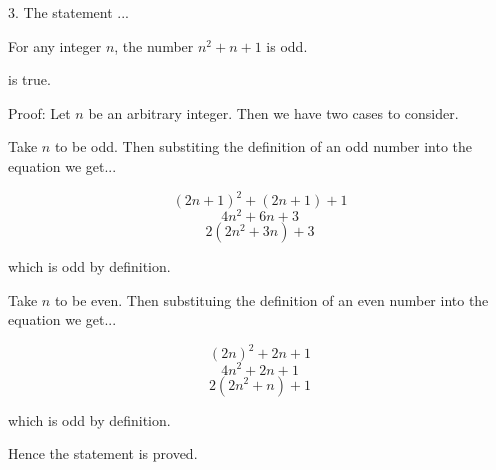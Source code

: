 \documentclass[12pt]{article}
\begin{document}
3. The statement ...\newline

For any integer $n$, the number $n^2 + n + 1$ is odd.\newline

is true.\newline

Proof: Let $n$ be an arbitrary integer. Then we have two cases to consider.\newline

Take $n$ to be odd.  Then substiting the definition of an odd number into the equation we get...

$$(2n+1)^2 + (2n+1) + 1$$
$$4n^2 + 6n + 3$$
$$2(2n^2 + 3n) + 3$$

which is odd by definition.\newline

Take $n$ to be even.  Then substituing the definition of an even number into the equation we get...

$$(2n)^2 + 2n + 1$$
$$4n^2 + 2n + 1$$
$$2(2n^2 + n) + 1$$

which is odd by definition.\newline

Hence the statement is proved.
\end{document}
